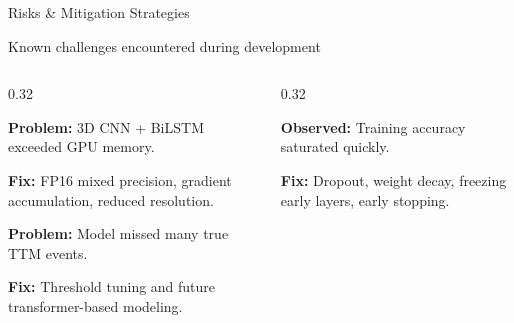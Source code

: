 \documentclass[aspectratio=169, 10pt]{beamer}
\begin{document}
\begin{frame}{Risks \& Mitigation Strategies}

\textcolor{NavyBlue}{\footnotesize
Known challenges encountered during development}

\vspace{2pt}

\small

\begin{columns}[T,onlytextwidth]

\begin{column}{0.32\textwidth}

\begin{tcolorbox}[
redcard,
title={\small GPU Memory (OOM)},
boxsep=1pt,
left=2pt,right=2pt,
top=2pt,bottom=2pt]

\footnotesize
\textbf{Problem:}
3D CNN + BiLSTM exceeded GPU memory.

\textbf{Fix:}
FP16 mixed precision, gradient accumulation, reduced resolution.

\end{tcolorbox}

\vspace{2pt}

\begin{tcolorbox}[
redcard,
title={\small Low Recall},
boxsep=1pt,
left=2pt,right=2pt,
top=2pt,bottom=2pt]

\footnotesize
\textbf{Problem:}
Model missed many true TTM events.

\textbf{Fix:}
Threshold tuning and future transformer-based modeling.

\end{tcolorbox}

\end{column}

\begin{column}{0.32\textwidth}

\begin{tcolorbox}[
purplecard,
title={\small Video CNN Overfitting},
boxsep=1pt,
left=2pt,right=2pt,
top=2pt,bottom=2pt]

\footnotesize
\textbf{Observed:}
Training accuracy saturated quickly.

\textbf{Fix:}
Dropout, weight decay, freezing early layers, early stopping.

\end{tcolorbox}

\vspace{2pt}


\end{column}
\end{columns}
\end{frame}
\end{document}
